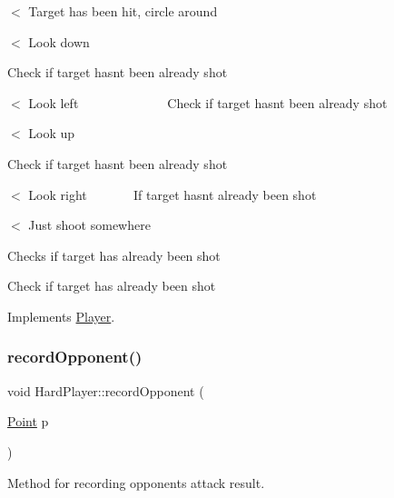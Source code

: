 $<$ Target has been hit, circle around

$<$ Look down

Check if target hasn\textquotesingle{}t been already shot

$<$ Look left ~\newline
~\newline
~\newline
~\newline
~\newline
~\newline
~\newline
~\newline
 Check if target hasn\textquotesingle{}t been already shot

$<$ Look up

Check if target hasn\textquotesingle{}t been already shot

$<$ Look right ~\newline
~\newline
~\newline
~\newline
 If target hasn\textquotesingle{}t already been shot

$<$ Just shoot somewhere

Checks if target has already been shot

Check if target has already been shot 

Implements \mbox{\hyperlink{class_player_a2cc7a83d11158eafd8d49d4b9f23ce56}{Player}}.

\mbox{\label{class_hard_player_a986175fb966099ac5fe39950e18799ae}} 
\subsubsection{\texorpdfstring{record\+Opponent()}{recordOpponent()}}
{\footnotesize\ttfamily void Hard\+Player\+::record\+Opponent (\begin{DoxyParamCaption}\item[{\mbox{\hyperlink{class_point}{Point}}}]{p }\end{DoxyParamCaption})\hspace{0.3cm}{\ttfamily [virtual]}}



Method for recording opponent\textquotesingle{}s attack result. 

